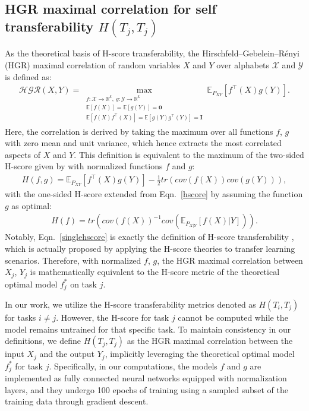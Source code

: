 \subsection{HGR maximal correlation for self transferability $H(T_j,T_j)$}
\label{sec:HGR}
As the theoretical basis of H-score transferability, the Hirschfeld–Gebelein–Rényi (HGR) maximal correlation of random variables $X$ and $Y$ over alphabets $\mathcal{X}$ and $\mathcal{Y}$ is defined as:
\begin{align}
    \mathcal{HGR}(X,Y) = \max_{\substack{
f: \mathcal{X} \to \mathbb{R}^k,\ g: \mathcal{Y} \to \mathbb{R}^k \\
\mathbb{E}[f(X)] =  \mathbb{E}[g(Y)] = \mathbf{0} \\
\mathbb{E}[f(X)f^\top(X)] = \mathbb{E}[g(Y)g^\top(Y)] = \mathbf{I}
}} 
\mathbb{E}_{P_{XY}}\left[f^\top(X) g(Y)\right].
\end{align}
Here, the correlation is derived by taking the maximum over all functions $f$, $g$ with zero mean and unit variance, which hence extracts the most correlated aspects of $X$ and $Y$. This definition is equivalent to the maximum of the two-sided H-score given by \cite{huang2019information} with normalized functions $f$ and $g$:
\begin{align}
    H(f,g) = \mathbb{E}_{P_{XY}}\left[f^\top(X)g(Y)\right] - \frac{1}{2}tr(cov(f(X)) cov(g(Y))),
\label{hscore}
\end{align}
with the one-sided H-score extended from Eqn.~\ref{hscore} by assuming the function $g$ as optimal:
\begin{align}
    H(f) = tr(cov(f(X))^{-1}cov(\mathbb{E}_{P_{X|Y}}[f(X)|Y])).
\label{singlehscore}
\end{align}
Notably, Eqn.~\ref{singlehscore} is exactly the definition of H-score transferability \citep{bao2019information}, which is actually proposed by applying the H-score theories to transfer learning scenarios. Therefore, with normalized $f$, $g$, the HGR maximal correlation between $X_j$, $Y_j$ is mathematically equivalent to the H-score metric of the theoretical optimal model $f^*_j$ on task $j$. 


In our work, we utilize the H-score transferability metrics denoted as \( H(T_i, T_j) \) for tasks \( i \neq j \). However, the H-score for task \( j \) cannot be computed while the model remains untrained for that specific task. To maintain consistency in our definitions, we define \( H(T_j, T_j) \) as the HGR maximal correlation between the input \( X_j \) and the output \( Y_j \), implicitly leveraging the theoretical optimal model \( f^*_j \) for task \( j \). Specifically, in our computations, the models \( f \) and \( g \) are implemented as fully connected neural networks equipped with normalization layers, and they undergo 100 epochs of training using a sampled subset of the training data through gradient descent.

